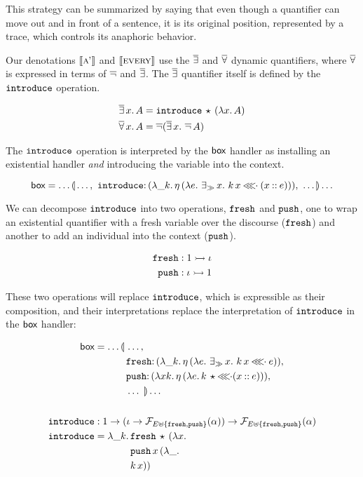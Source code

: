 This strategy can be summarized by saying that even though a quantifier can
move out and in front of a sentence, it is its original position,
represented by a trace, which controls its anaphoric behavior.

Our denotations $\llbracket \textsc{a'} \rrbracket$ and $\llbracket \textsc{every} \rrbracket$ use the $\mathop{\overline{\exists}}$
and $\mathop{\overline{\forall}}$ dynamic quantifiers, where $\mathop{\overline{\forall}}$ is expressed in terms
of $\mathop{\overline{\lnot}}$ and $\mathop{\overline{\exists}}$. The $\mathop{\overline{\exists}}$ quantifier itself is defined by
the $\mathtt{introduce}$ operation.

\begin{align*}
  \mathop{\overline{\exists}} x.\,A &= \mathtt{introduce}\,\star\,(\lambda x.\, A) \\
  \mathop{\overline{\forall}} x.\,A &= \mathop{\overline{\lnot}} (\mathop{\overline{\exists}} x.\,\mathop{\overline{\lnot}} A)
\end{align*}

The $\mathtt{introduce}$ operation is interpreted by the $\textsf{box}$ handler as
installing an existential handler \emph{and} introducing the variable into
the context.

$$
\BOX = \ldots \banana{\ldots,\ \onto{\op{introduce}}{(\lam{\_ k}{\etaE{(\lam{e}{\existsr x.\ \ap{k}{x} \apll (x \cons e)})}})},\ \ldots} \ldots
$$

We can decompose $\mathtt{introduce}$ into two operations, $\mathtt{fresh}$ and
$\mathtt{push}$, one to wrap an existential quantifier with a fresh variable
over the discourse ($\mathtt{fresh}$) and another to add an individual into the
context ($\mathtt{push}$).

\begin{align*}
  \mathtt{fresh} &: 1 \rightarrowtail \iota \\
  \mathtt{push} &: \iota \rightarrowtail 1
\end{align*}

These two operations will replace $\mathtt{introduce}$, which is expressible as
their composition, and their interpretations replace the interpretation of
$\mathtt{introduce}$ in the $\textsf{box}$ handler:

\begin{align*}
  \BOX &= \ldots \lban\begin{aligned}[t]
      &\ldots, \\
      &\onto{\op{fresh}}{(\lam{\_ k}{\etaE{(\lam{e}{\existsr x.\ \ap{k}{x} \apll e})}})}, \\
      &\onto{\op{push}}{(\lam{x k}{\etaE{(\lam{e}{\ap{k}{\star} \apll (x \cons e)})}})}, \\
      &\ldots\ \rban \ldots
    \end{aligned} \\
  \\
  \op{introduce} &: 1 \to (\iota \to \FF_{E \uplus \{\op{fresh},
                    \op{push}\}}(\alpha)) \to \FF_{E \uplus \{\op{fresh},
                    \op{push}\}}(\alpha) \\
  \op{introduce} &= \lam{\_ k}{\begin{aligned}[t]
      &\app{\op{fresh}}{\star}{(\lam{x}{ \\
      &\app{\op{push}}{x}{(\lam{\_}{ \\
      &\ap{k}{x}})}})}
    \end{aligned}}
\end{align*}


